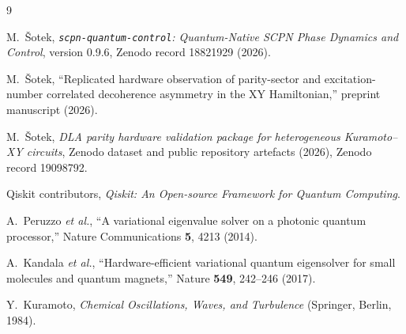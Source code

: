 \documentclass[preprint,aps,physrev,superscriptaddress,floatfix,longbibliography]{revtex4-2}
\begin{document}
\begin{thebibliography}{9}

M.~\v{S}otek,
\emph{\texttt{scpn-quantum-control}: Quantum-Native SCPN Phase Dynamics
and Control}, version 0.9.6,
Zenodo record 18821929 (2026).

M.~\v{S}otek,
``Replicated hardware observation of parity-sector and excitation-number
correlated decoherence asymmetry in the XY Hamiltonian,''
preprint manuscript (2026).

M.~\v{S}otek,
\emph{DLA parity hardware validation package for heterogeneous
Kuramoto--XY circuits},
Zenodo dataset and public repository artefacts (2026),
Zenodo record 19098792.

Qiskit contributors,
\emph{Qiskit: An Open-source Framework for Quantum Computing}.

A.~Peruzzo \emph{et al.},
``A variational eigenvalue solver on a photonic quantum processor,''
Nature Communications \textbf{5}, 4213 (2014).

A.~Kandala \emph{et al.},
``Hardware-efficient variational quantum eigensolver for small molecules
and quantum magnets,''
Nature \textbf{549}, 242--246 (2017).

Y.~Kuramoto,
\emph{Chemical Oscillations, Waves, and Turbulence}
(Springer, Berlin, 1984).

\end{thebibliography}
\end{document}
